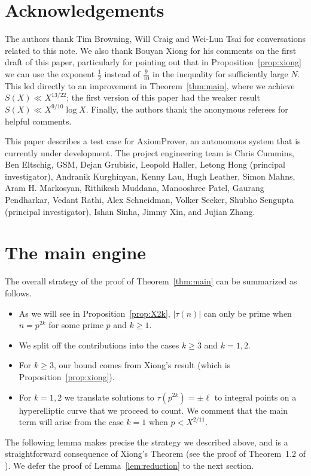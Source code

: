 \documentclass[12pt]{amsart}
\theoremstyle{remark}
\numberwithin{equation}{section}
\newif\ifmanyauthors
\begin{document}
\section*{Acknowledgements}
\noindent The authors thank Tim Browning, Will Craig and Wei-Lun Tsai
for conversations related to this note.
We also thank Bouyan Xiong for his comments on the first draft of this paper,
particularly for pointing out that in Proposition~\ref{prop:xiong} we can
use the exponent $\frac{1}{2}$ instead of $\frac{9}{10}$ in the inequality for sufficiently large $N.$
This led directly to an improvement in Theorem~\ref{thm:main},
where we achieve $S(X) \ll X^{13/22}$;
the first version of this paper had the weaker result $S(X) \ll X^{9/10} \log X$.
Finally, the authors thank the anonymous referees for helpful comments.

\ifmanyauthors
\else
This paper describes a test case for AxiomProver,
an autonomous system that is currently under development.
The project engineering team is
Chris Cummins,
Ben Eltschig,
GSM,
Dejan Grubisic,
Leopold Haller,
Letong Hong (principal investigator),
Andranik Kurghinyan,
Kenny Lau,
Hugh Leather,
Simon Mahns,
Aram H. Markosyan,
Rithikesh Muddana,
Manooshree Patel,
Gaurang Pendharkar,
Vedant Rathi,
Alex Schneidman,
Volker Seeker,
Shubho Sengupta (principal investigator),
Ishan Sinha,
Jimmy Xin,
and Jujian Zhang.
\fi

\section{The main engine}\label{sec:engine}
The overall strategy of the proof of Theorem~\ref{thm:main} can be summarized as follows.
\begin{itemize}
  \item As we will see in Proposition~\ref{prop:X2k},
  $|\tau(n)|$ can only be prime when $n = p^{2k}$ for some prime $p$ and $k \ge 1$.
  \item We split off the contributions into the cases $k \ge 3$ and $k = 1, 2$.
  \item For $k \ge 3$, our bound comes from Xiong's result (which is Proposition~\ref{prop:xiong}).
  \item For $k = 1, 2$ we translate solutions to $\tau(p^{2k}) = \pm \ell$ to integral points
  on a hyperelliptic curve that we proceed to count.
  We comment that the main term will arise from the case $k = 1$ when $p < X^{2/11}$.
\end{itemize}

The following lemma makes precise the strategy we described above,
and is a straightforward consequence
of Xiong's Theorem (see the proof of Theorem~1.2 of \cite{Xiong2025}).
We defer the proof of Lemma~\ref{lem:reduction} to the next section.
\end{document}
